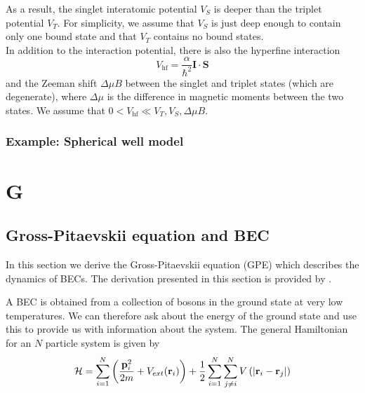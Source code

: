 \documentclass{book}
\theoremstyle{definition}
\newcommand{\ham}{\mathcal{H}}
\newcommand{\al}{\alpha}
\newcommand{\f}[2]{\frac{#1}{#2}}
\newcommand{\lp}{\left(}
\newcommand{\rp}{\right)}
\begin{document}
As a result, the singlet interatomic potential $V_S$ is deeper than the triplet potential $V_T$. For simplicity, we assume that $V_S$ is just deep enough to contain only one bound state and that $V_T$ contains no bound states.\\


In addition to the interaction potential, there is also the hyperfine interaction
\begin{equation*}
V_\text{hf} = \f{\al}{\hbar^2} \mathbf{I}\cdot \mathbf{S}
\end{equation*}
and the Zeeman shift $\Delta \mu B$ between the singlet and triplet states (which are degenerate), where $\Delta \mu$ is the difference in magnetic moments between the two states. We assume that $0< V_\text{hf} \ll V_T,V_S,\Delta \mu B$. 


\subsection*{Example: Spherical well model}









\chapter*{G}


\section*{Gross-Pitaevskii equation and BEC}

In this section we derive the Gross-Pitaevskii equation (GPE) which describes the dynamics of BECs. The derivation presented in this section is provided by \cite{rogel2013gross}. 


A BEC is obtained from a collection
of bosons in the ground state at very low temperatures. We can therefore ask about
the energy of the ground state and use this to provide us with information about the
system. The general Hamiltonian for an $N$ particle system is given by 
\begin{equation*}
\ham = \sum^N_{i=1} \lp \f{\mathbf{p}_i^2}{2m} + V_{ext}(\mathbf{r}_i) \rp + \f{1}{2}\sum^N_{i=1}\sum^N_{j\neq i}V\lp \abs{\mathbf{r}_i - \mathbf{r}_j} \rp
\end{equation*}
\end{document}
